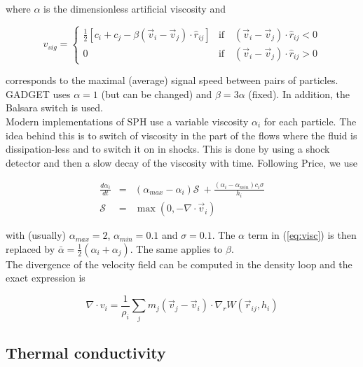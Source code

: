 \documentclass[a4paper,10pt]{article}
\begin{document}
where $\alpha$ is the dimensionless artificial viscosity and

\begin{equation}
 v_{sig} = \begin{cases}
	    \frac{1}{2}\left[c_i + c_j - \beta\left(\vec{v}_i-\vec{v}_j\right)\cdot\hat{r}_{ij} \right] &
\mbox{if} \quad \left(\vec{v}_i-\vec{v}_j\right)\cdot \hat{r}_{ij} < 0\\
            0 & \mbox{if} \quad \left(\vec{v}_i-\vec{v}_j\right)\cdot \hat{r}_{ij} > 0
            \end{cases}
\end{equation}

corresponds to the maximal (average) signal speed between pairs of particles.
GADGET uses $\alpha=1$ (but can be changed) and $\beta=3\alpha$ (fixed). In addition, the Balsara switch is used. \\

Modern implementations of SPH use a variable viscosity $\alpha_i$ for each particle. The idea behind this is to switch
of viscosity in the part of the flows where the fluid is dissipation-less and to switch it on in shocks. This is done by
using a shock detector and then a slow decay of the viscosity with time. Following Price, we use

\begin{eqnarray}
 \frac{d\alpha_i}{dt} &=& \left(\alpha_{max}-\alpha_i\right)\mathcal{S}~+\frac{(\alpha_i-\alpha_{min})c_i\sigma}{h_i}\\
 \mathcal{S} &=& \max\left(0, -\nabla\cdot \vec{v}_i \right)
\end{eqnarray}

with (usually) $\alpha_{max} = 2$, $\alpha_{min} = 0.1$ and $\sigma=0.1$. The $\alpha$ term in (\ref{eq:visc}) is then
replaced by $\bar\alpha = \frac{1}{2}(\alpha_i + \alpha_j)$. The same applies to $\beta$.\\
The divergence of the velocity field can be computed in the density loop and the exact expression is

\begin{equation}
 \label{eq:div_v}
 \nabla\cdot v_i = \frac{1}{\rho_i}\sum_j m_j \left(\vec{v}_j - \vec{v}_i\right)\cdot \nabla_r W(\vec{r}_{ij},h_i) 
\end{equation}

\subsection{Thermal conductivity}
\end{document}

